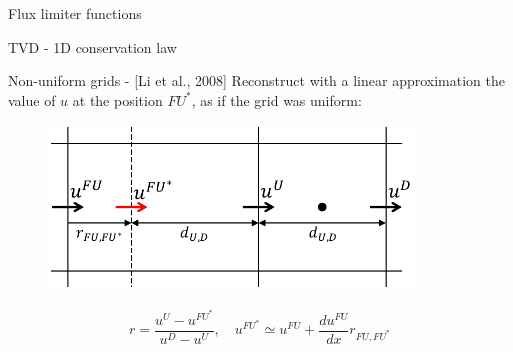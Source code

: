 \documentclass{beamer}
\begin{document}
\begin{frame}{Flux limiter functions}
\begin{figure}
	\centering
	\hspace{-1cm}
	
\end{figure}
\end{frame}
\begin{frame}{TVD - 1D conservation law}
\begin{figure}
	\centering
	\hspace{-1cm}
	
\end{figure}
\end{frame}
\begin{frame}{Non-uniform grids - [Li et al., 2008]}
Reconstruct with a linear approximation the value of $u$ at the position 
$FU^*$, as if the grid was uniform:
\begin{figure}
	\centering
	\includegraphics[width=0.86\textwidth]{non_uniform_cells2.pdf}
\end{figure}
\begin{equation*}
r = \frac{u^U - u^{FU^*}}{u^D-u^U}, \quad u^{FU^*} \simeq u^{FU} + 
\frac{du^{FU}}{dx}r_{FU, FU^*}
\end{equation*}
\end{frame}
\end{document}
